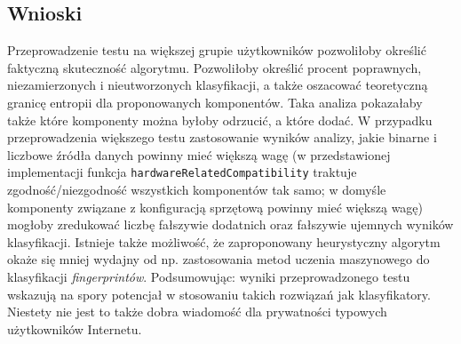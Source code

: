 \subsection{Wnioski}
Przeprowadzenie testu na większej grupie użytkowników pozwoliłoby określić
faktyczną skuteczność algorytmu. Pozwoliłoby określić procent poprawnych,
niezamierzonych i nieutworzonych klasyfikacji, a także oszacować teoretyczną
granicę entropii dla proponowanych komponentów. Taka analiza pokazałaby także
które komponenty można byłoby odrzucić, a które dodać. W przypadku
przeprowadzenia większego testu zastosowanie wyników analizy, jakie binarne i
liczbowe źródła danych powinny mieć większą wagę (w przedstawionej implementacji
funkcja \texttt{hardwareRelatedCompatibility} traktuje zgodność/niezgodność
wszystkich komponentów tak samo; w domyśle komponenty związane z konfiguracją
sprzętową powinny mieć większą wagę) mogłoby zredukować liczbę fałszywie
dodatnich oraz fałszywie ujemnych wyników klasyfikacji. Istnieje także
możliwość, że zaproponowany heurystyczny algorytm okaże się mniej wydajny od np.
zastosowania metod uczenia maszynowego do klasyfikacji \emph{fingerprintów}.
Podsumowując: wyniki przeprowadzonego testu wskazują na spory potencjał w
stosowaniu takich rozwiązań jak klasyfikatory. Niestety nie jest to także dobra
wiadomość dla prywatności typowych użytkowników Internetu.
